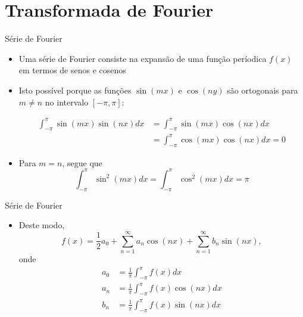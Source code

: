 \section{Transformada de Fourier}

\begin{frame}[fragile]{Série de Fourier}

    \begin{itemize}
        \item Uma série de Fourier consiste na expansão de uma função períodica $f(x)$ em termos
            de senos e cosenos

        \item Isto possível porque as funções $\sin(mx)$ e $\cos(ny)$ são ortogonais para 
            $m\neq n$ no intervalo $[-\pi, \pi]$:

        \begin{align*}
            \int_{-\pi}^\pi \sin(mx)\sin(nx) dx &= 
            \int_{-\pi}^\pi \sin(mx)\cos(nx) dx \\
            &= \int_{-\pi}^\pi \cos(mx)\cos(nx) dx = 0
        \end{align*}

        \item Para $m = n$, segue que
        \[
            \int_{-\pi}^\pi \sin^2(mx) dx = 
            \int_{-\pi}^\pi \cos^2(mx) dx = \pi
        \]

    \end{itemize}

\end{frame}

\begin{frame}[fragile]{Série de Fourier}

    \begin{itemize}
        \item Deste modo,
        \[
            f(x) = \frac{1}{2}a_0 + \sum_{n=1}^\infty a_n\cos(n x) + \sum_{n=1}^\infty b_n\sin(nx),
        \]
        onde
        \begin{align*}
            a_0 &= \frac{1}{\pi}\int_{-\pi}^{\pi} f(x)dx \\    
            a_n &= \frac{1}{\pi}\int_{-\pi}^{\pi} f(x)\cos(nx)dx \\    
            b_n &= \frac{1}{\pi}\int_{-\pi}^{\pi} f(x)\sin(nx)dx    
        \end{align*}
    
    \end{itemize}

\end{frame}

